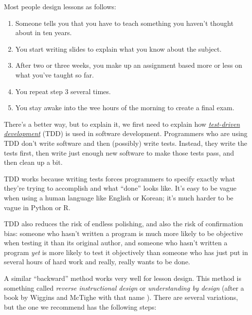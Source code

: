 
Most people design lessons as follows:

\begin{enumerate}

\item
  Someone tells you that you have to teach something you haven't
  thought about in ten years.

\item
  You start writing slides to explain what you know about the subject.

\item
  After two or three weeks, you make up an assignment based more or
  less on what you've taught so far.

\item
  You repeat step 3 several times.

\item
  You stay awake into the wee hours of the morning to create a final
  exam.

\end{enumerate}

There's a better way, but to explain it, we first need to explain how
\emph{\href{https://en.wikipedia.org/wiki/Test-driven\_development}{test-driven
development}} (TDD) is used in software development.  Programmers who
are using TDD don't write software and then (possibly) write tests.
Instead, they write the tests first, then write just enough new
software to make those tests pass, and then clean up a bit.

TDD works because writing tests forces programmers to specify exactly
what they're trying to accomplish and what ``done'' looks like. It's
easy to be vague when using a human language like English or Korean;
it's much harder to be vague in Python or R.

TDD also reduces the risk of endless polishing, and also the risk of
confirmation bias: someone who hasn't written a program is much more
likely to be objective when testing it than its original author, and
someone who hasn't written a program \emph{yet} is more likely to test
it objectively than someone who has just put in several hours of hard
work and really, really wants to be done.

A similar ``backward'' method works very well for lesson design.  This
method is something called \emph{reverse instructional design} or
\emph{understanding by design} (after a book by Wiggins and McTighe
with that name \cite{bib:wiggins-mctighe}).  There are several
variations, but the one we recommend has the following steps:


